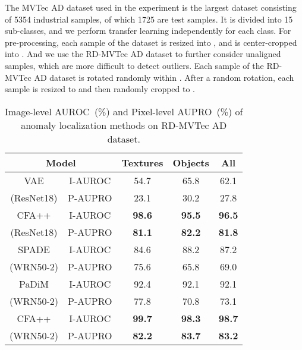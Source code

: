 \documentclass[10pt,twocolumn,letterpaper]{article}
\begin{document}
        The MVTec AD dataset used in the experiment is the largest dataset consisting of 5354 industrial samples, of which 1725 are test samples.
        It is divided into 15 sub-classes, and we perform transfer learning independently for each class.
        For pre-processing, each sample of the dataset is resized into , and is center-cropped into . 
        And we use the RD-MVTec AD dataset to further consider unaligned samples, which are more difficult to detect outliers.
        Each sample of the RD-MVTec AD dataset is rotated randomly within . 
        After a random rotation, each sample is resized to  and then randomly cropped to . 
        \begin{table}[t]
\caption{Image-level AUROC~(\%) and Pixel-level AUPRO~(\%) of anomaly localization methods on RD-MVTec AD dataset.}
\begin{center}\small
\begin{tabular}{c | c | c c c}
    \toprule
    \multicolumn{2}{c|}{Model}             & Textures & Objects & All  \\
    \midrule
    VAE                         & I-AUROC  &   54.7   &   65.8  & 62.1 \\
    (ResNet18)                  & P-AUPRO  &   23.1   &   30.2  & 27.8 \\    
    \midrule
    CFA++                       & I-AUROC  &   \textbf{98.6}   &   \textbf{95.5}  & \textbf{96.5} \\
    (ResNet18)                  & P-AUPRO  &   \textbf{81.1}   &   \textbf{82.2}  & \textbf{81.8} \\
    \midrule
    \midrule
    SPADE                       & I-AUROC  &   84.6   &   88.2  & 87.2 \\
    (WRN50-2)                   & P-AUPRO  &   75.6   &   65.8  & 69.0 \\    
    \midrule
    PaDiM                       & I-AUROC  &   92.4   &   92.1  & 92.1 \\
    (WRN50-2)                   & P-AUPRO  &   77.8   &   70.8  & 73.1 \\    
    \midrule
    CFA++                      & I-AUROC  &   \textbf{99.7}   &   \textbf{98.3}  & \textbf{98.7} \\
    (WRN50-2)                   & P-AUPRO  &   \textbf{82.2}    &  \textbf{83.7}  & \textbf{83.2} \\   
    \bottomrule
\end{tabular}
\end{center}
\label{table:rd-mvtec-ad}\vspace{-0.15cm}
\end{table}
\end{document}
